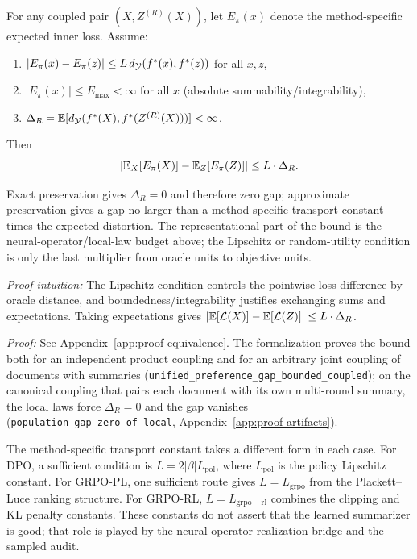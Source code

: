 \begin{theorem}\label{thm:unified-gap}
For any coupled pair $(X, Z^{(R)}(X))$, let $E_\pi(x)$ denote the method-specific expected inner loss. Assume:
\begin{enumerate}[nosep]
\item $|E_\pi(x)-E_\pi(z)| \le L\,d_{\mathcal{Y}}(f^\ast(x),f^\ast(z))$ for all $x,z$,
\item $|E_\pi(x)| \le E_{\max} < \infty$ for all $x$ (absolute summability/integrability),
\item $\Delta_R = \mathbb{E}[d_{\mathcal{Y}}(f^\ast(X),f^\ast(Z^{(R)}(X)))] < \infty$.
\end{enumerate}
Then
\[
\left| \mathbb{E}_X[E_\pi(X)] - \mathbb{E}_Z[E_\pi(Z)] \right| \le L \cdot \Delta_R.
\]
\end{theorem}

\noindent Exact preservation gives $\Delta_R = 0$ and therefore zero gap; approximate preservation gives a gap no larger than a method-specific transport constant times the expected distortion. The representational part of the bound is the neural-operator/local-law budget above; the Lipschitz or random-utility condition is only the last multiplier from oracle units to objective units.

\noindent\textit{Proof intuition:} The Lipschitz condition controls the pointwise loss difference by oracle distance, and boundedness/integrability justifies exchanging sums and expectations. Taking expectations gives $|\mathbb{E}[\mathcal{L}(X)] - \mathbb{E}[\mathcal{L}(Z)]| \le L \cdot \Delta_R$.

\noindent\textit{Proof:} See Appendix~\ref{app:proof-equivalence}. The formalization proves the bound both for an independent product coupling and for an arbitrary joint coupling of documents with summaries (\texttt{unified\_preference\_gap\_bounded\_coupled}); on the canonical coupling that pairs each document with its own multi-round summary, the local laws force $\Delta_R = 0$ and the gap vanishes (\texttt{population\_gap\_zero\_of\_local}, Appendix~\ref{app:proof-artifacts}).

The method-specific transport constant takes a different form in each case. For DPO, a sufficient condition is $L = 2|\beta| L_{\mathrm{pol}}$, where $L_{\mathrm{pol}}$ is the policy Lipschitz constant. For GRPO-PL, one sufficient route gives $L = L_{\mathrm{grpo}}$ from the Plackett--Luce ranking structure. For GRPO-RL, $L = L_{\mathrm{grpo-rl}}$ combines the clipping and KL penalty constants. These constants do not assert that the learned summarizer is good; that role is played by the neural-operator realization bridge and the sampled audit.


